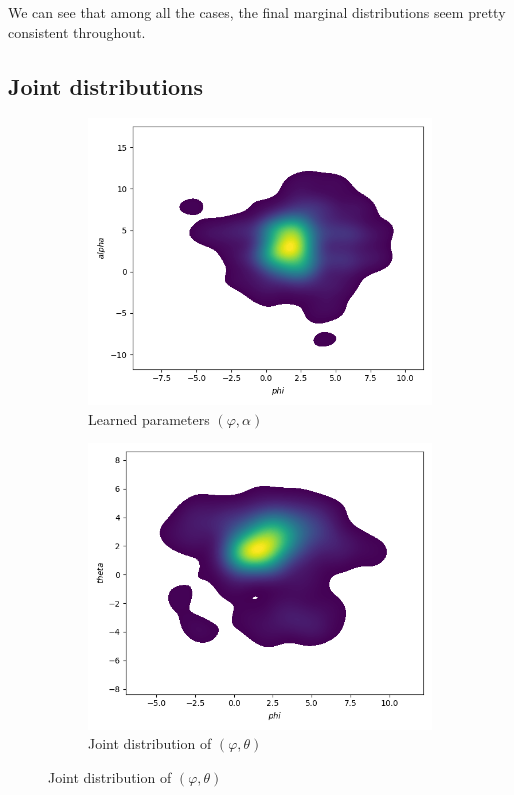 \documentclass[a4paper,12pt]{article}
\theoremstyle{definition}
\begin{document}
We can see that among all the cases, the final marginal distributions seem pretty consistent throughout.


\subsection{Joint distributions}

\begin{figure}[H]
    \centering

    \begin{subfigure}[b]{0.45\textwidth}
        \centering
        \includegraphics[width=\textwidth]{VariableSelection/joint_phi_alpha.png}
        \caption{Learned parameters \((\varphi, \alpha)\)}
        \label{fig:joint_phi_alpha}
    \end{subfigure}
    \hfill
    \begin{subfigure}[b]{0.45\textwidth}
        \centering
        \includegraphics[width=\textwidth]{VariableSelection/joint_phi_theta.png}
        \caption{Joint distribution of \((\varphi, \theta)\)}
        \label{fig:joint_phi_theta}
    \end{subfigure}


\end{figure}
\end{document}
